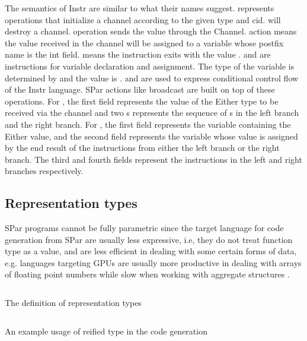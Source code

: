 The semantics of Instr are similar to what their names suggest.  represents operations that initialize a channel according to the given type and cid.  will destroy a channel.  operation sends the value  through the Channel.  action means the value received in the channel will be assigned to a variable whose postfix name is the int field.  means the instruction exits with the value .  and  are instructions for variable declaration and assignment. The type of the variable is determined by  and the value is .  and  are used to express conditional control flow of the Instr language. SPar actions like broadcast are built on top of these operations. For , the first field represents the value of the Either type to be received via the channel and two s represents the sequence of s in the left branch and the right branch. For , the first field represents the variable containing the Either value, and the second field represents the variable whose value is assigned by the end result of the instructions from either the left branch or the right branch. The third and fourth fields represent the instructions in the left and right branches respectively.

\subsection{Representation types} \label{codegen:sec:repr}
SPar programs cannot be fully parametric since the target language for code generation from SPar are usually less expressive, i.e, they do not treat function type  as a value, and are less efficient in dealing with some certain forms of data, e.g. languages targeting GPUs are usually more productive in dealing with arrays of floating point numbers while slow when working with aggregate structures \cite{mcdonellTypesafeRuntimeCode}. 
\begin{listing}
    \inputminted{Haskell}{codegen/repr.hs}    
    \caption{The definition of representation types}
    \label{codegen:code:repr}
\end{listing}
\begin{listing}
    \inputminted{Haskell}{codegen/const.hs} 
    \caption{An example usage of reified type in the code generation}
    \label{codegen:code:const}
\end{listing}

